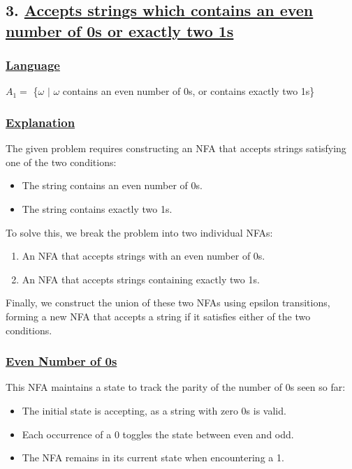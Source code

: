 \documentclass[12pt]{article}
\begin{document}
	
	\newpage
	\subsection*{3. \underline{Accepts strings which contains an even number of 0s or exactly two 1s} }
	\vspace{2mm}
	\subsubsection*{\underline{Language}}
	\begin{tcolorbox}[colback=white,colframe=transitioncol,arc=0mm]
		$A_1 =$ \{$\omega$ $|$ $\omega$ contains an even number of 0s, or contains exactly two 1s\}
	\end{tcolorbox}
	
	\subsubsection*{\underline{Explanation}}
	The given problem requires constructing an NFA that accepts strings satisfying one of the two conditions:
	\begin{itemize}
		\item The string contains an even number of 0s.
		\item The string contains exactly two 1s.
	\end{itemize}
	
	To solve this, we break the problem into two individual NFAs:
	\begin{enumerate}
		\item An NFA that accepts strings with an even number of 0s.
		\item An NFA that accepts strings containing exactly two 1s.
	\end{enumerate}
	
	Finally, we construct the union of these two NFAs using epsilon transitions, forming a new NFA that accepts a string if it satisfies either of the two conditions.
	
	\subsubsection*{\underline{Even Number of 0s}}
	This NFA maintains a state to track the parity of the number of 0s seen so far:
	\begin{itemize}
		\item The initial state is accepting, as a string with zero 0s is valid.
		\item Each occurrence of a 0 toggles the state between even and odd.
		\item The NFA remains in its current state when encountering a 1.
	\end{itemize}
	
\end{document}
